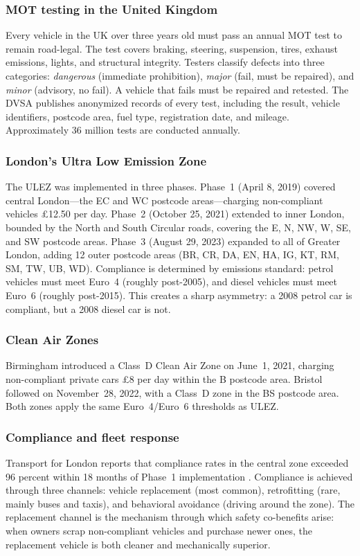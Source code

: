 \documentclass[12pt]{article}
\begin{document}
\subsubsection*{MOT testing in the United Kingdom} Every vehicle in the UK over three years old must pass an annual MOT test to remain road-legal. The test covers braking, steering, suspension, tires, exhaust emissions, lights, and structural integrity. Testers classify defects into three categories: \textit{dangerous} (immediate prohibition), \textit{major} (fail, must be repaired), and \textit{minor} (advisory, no fail). A vehicle that fails must be repaired and retested. The DVSA publishes anonymized records of every test, including the result, vehicle identifiers, postcode area, fuel type, registration date, and mileage. Approximately 36 million tests are conducted annually.

\subsubsection*{London's Ultra Low Emission Zone} The ULEZ was implemented in three phases. Phase~1 (April 8, 2019) covered central London---the EC and WC postcode areas---charging non-compliant vehicles \pounds12.50 per day. Phase~2 (October 25, 2021) extended to inner London, bounded by the North and South Circular roads, covering the E, N, NW, W, SE, and SW postcode areas. Phase~3 (August 29, 2023) expanded to all of Greater London, adding 12 outer postcode areas (BR, CR, DA, EN, HA, IG, KT, RM, SM, TW, UB, WD). Compliance is determined by emissions standard: petrol vehicles must meet Euro~4 (roughly post-2005), and diesel vehicles must meet Euro~6 (roughly post-2015). This creates a sharp asymmetry: a 2008 petrol car is compliant, but a 2008 diesel car is not.

\subsubsection*{Clean Air Zones} Birmingham introduced a Class~D Clean Air Zone on June~1, 2021, charging non-compliant private cars \pounds8 per day within the B postcode area. Bristol followed on November~28, 2022, with a Class~D zone in the BS postcode area. Both zones apply the same Euro~4/Euro~6 thresholds as ULEZ.

\subsubsection*{Compliance and fleet response} Transport for London reports that compliance rates in the central zone exceeded 96 percent within 18 months of Phase~1 implementation \citep{tfl2022}. Compliance is achieved through three channels: vehicle replacement (most common), retrofitting (rare, mainly buses and taxis), and behavioral avoidance (driving around the zone). The replacement channel is the mechanism through which safety co-benefits arise: when owners scrap non-compliant vehicles and purchase newer ones, the replacement vehicle is both cleaner and mechanically superior.
\end{document}
